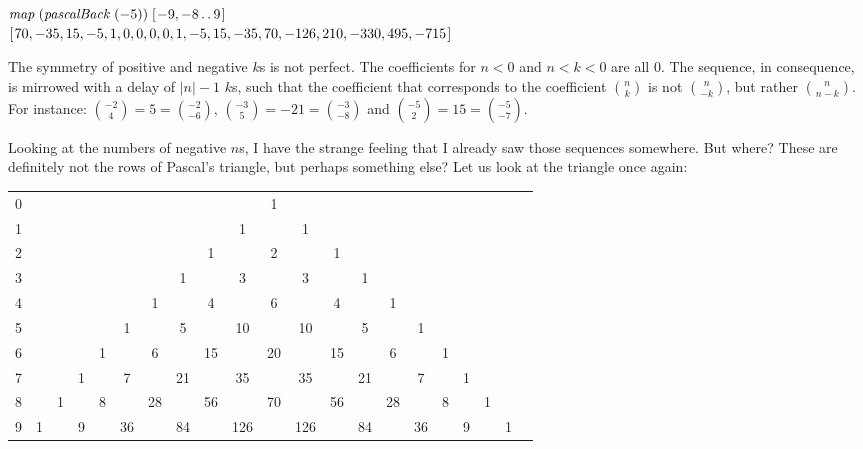 \documentclass[tikz]{scrreprt}
\newcommand{\Varid}[1]{\mathit{#1}}
\begin{document}
\ensuremath{\Varid{map}\;(\Varid{pascalBack}\;(\mathbin{-}\mathrm{5}))\;[\mskip1.5mu \mathbin{-}\mathrm{9},\mathbin{-}\mathrm{8}\mathinner{\ldotp\ldotp}\mathrm{9}\mskip1.5mu]}\\
\ensuremath{[\mskip1.5mu \mathrm{70},\mathbin{-}\mathrm{35},\mathrm{15},\mathbin{-}\mathrm{5},\mathrm{1},\mathrm{0},\mathrm{0},\mathrm{0},\mathrm{0},\mathrm{1},\mathbin{-}\mathrm{5},\mathrm{15},\mathbin{-}\mathrm{35},\mathrm{70},\mathbin{-}\mathrm{126},\mathrm{210},\mathbin{-}\mathrm{330},\mathrm{495},\mathbin{-}\mathrm{715}\mskip1.5mu]}

The symmetry of positive and negative $k$s is not perfect.
The coefficients for $n<0$ and $n < k < 0$ are all 0.
The sequence, in consequence, is mirrowed
with a delay of $|n|-1$ $k$s, such that
the coefficient that corresponds to the coefficient $\binom{n}{k}$
is not $\binom{n}{-k}$, but rather $\binom{n}{n-k}$.
For instance: 
$\binom{-2}{4} = 5 = \binom{-2}{-6}$,
$\binom{-3}{5} = -21 = \binom{-3}{-8}$ and
$\binom{-5}{2} = 15 = \binom{-5}{-7}$.

Looking at the numbers of negative $n$s,
I have the strange feeling that I already
saw those sequences somewhere.
But where? These are definitely not the rows
of Pascal's triangle, but perhaps something else?
Let us look at the triangle once again:

\begin{tabular}{l c c c c c c c c c c c c c c c c c c c c}
0 &   &   &   &   &    &    &    &    &     &  1 &     &    &    &    &    &   &   &   &   &  \\
1 &   &   &   &   &    &    &    &    &   1 &    &   1 &    &    &    &    &   &   &   &   &  \\
2 &   &   &   &   &    &    &    &  1 &     &  2 &     &  1 &    &    &    &   &   &   &   &  \\
3 &   &   &   &   &    &    &  1 &    &   3 &    &   3 &    &  1 &    &    &   &   &   &   &  \\
4 &   &   &   &   &    &  1 &    &  4 &     &  6 &     &  4 &    &  1 &    &   &   &   &   &  \\
5 &   &   &   &   &  1 &    &  5 &    &  10 &    &  10 &    &  5 &    &  1 &   &   &   &   &  \\   
6 &   &   &   & 1 &    &  6 &    & 15 &     & 20 &     & 15 &    &  6 &    & 1 &   &   &   &  \\
7 &   &   & 1 &   &  7 &    & 21 &    &  35 &    &  35 &    & 21 &    &  7 &   & 1 &   &   &  \\
8 &   & 1 &   & 8 &    & 28 &    & 56 &     & 70 &     & 56 &    & 28 &    & 8 &   & 1 &   & \\
9 & 1 &   & 9 &   & 36 &    & 84 &    & 126 &    & 126 &    & 84 &    & 36 &   & 9 &   & 1
\end{tabular}
\end{document}
